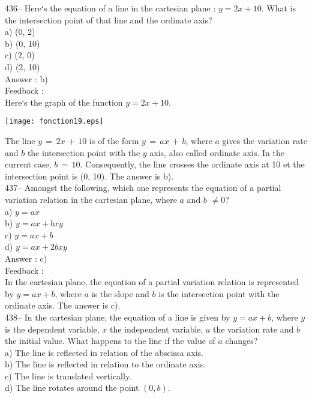 \documentclass[letterpaper, 12pt]{article}
\begin{document}
436-- Here`s the equation of a line in the cartesian plane : $y=2x+10$.
What is the intersection point of that line and the ordinate axis?\\
a) (0, 2)\\
b) (0, 10)\\
c) (2, 0)\\
d) (2, 10)\\

Answer :  b)\\

Feedback : \\
Here`s the graph of the function $y=2x+10$.\\
    \begin{center}
    \texttt{[image: fonction19.eps]}
    \end{center}

The line $y\,=\,2x\,+\,10$ is of the form $y\,=\,ax\,+\,b$, where
$a$ gives the variation rate and $b$ the intersection point with the $y$ axis, also called ordinate axis.
In the current case, $b\,=\,10$.  Consequently, the line crosses the ordinate axis at 10 et the intersection point is
(0, 10). The answer is
b).\\

437-- Amongst the following, which one represents the equation of a partial variation relation in the cartesian plane, where $a$ and
$b$ $\neq0$?\\
a) $y=ax$\\
b) $y=ax+bxy$\\
c) $y=ax+b$\\
d) $y=ax+2bxy$\\


Answer : c)\\

Feedback : \\
In the cartesian plane, the equation of a partial variation relation is represented by $y=ax+b$, where $a$ is the slope and $b$ is the intersection point with the ordinate axis.  The answer is c).\\

438-- In the cartesian plane, the equation of a line is given by $y=ax+b$, where $y$ is the dependent variable, $x$ the independent variable, $a$ the variation rate and $b$ the initial value.
What happens to the line if the value of $a$ changes?\\
a) The line is reflected in relation of the abscissa axis.\\
b) The line is reflected in relation to the ordinate axis.\\
c) The line is translated vertically.\\
d) The line rotates around the point $(0,b)$.\\
\end{document}
